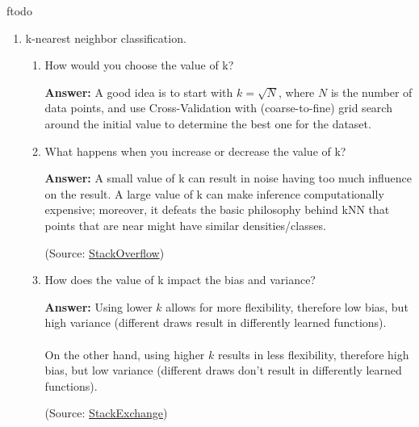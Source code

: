 ƒtodo\documentclass{article}
\newenvironment{QandA}{\begin{enumerate}[label=\arabic*.]}{\end{enumerate}}
\newenvironment{InnerQandA}{\begin{enumerate}[label=\roman*.]}{\end{enumerate}}
\newenvironment{answer}{\par\normalfont \textbf{Answer:}}{}
\begin{document}
\begin{QandA}
    \item k-nearest neighbor classification.
    \begin{InnerQandA}
        \item How would you choose the value of k?
        \begin{answer}
            A good idea is to start with $k = \sqrt{N}$, where $N$ is the number of data points, and use Cross-Validation with (coarse-to-fine) grid search around the initial value to determine the best one for the dataset.
        \end{answer}

        \item What happens when you increase or decrease the value of k?
        \begin{answer}
            A small value of k can result in noise having too much influence on the result. A large value of k can make inference computationally expensive; moreover, it defeats the basic philosophy behind kNN that points that are near might have similar densities/classes.  

            (Source: \href{https://stackoverflow.com/questions/11568897/value-of-k-in-k-nearest-neighbor-algorithm}{StackOverflow})
        \end{answer}

        \item How does the value of k impact the bias and variance?
        \begin{answer}
            Using lower $k$ allows for more flexibility, therefore low bias, but high variance (different draws result in differently learned functions).\\\\
            On the other hand, using higher $k$ results in less flexibility, therefore high bias, but low variance (different draws don't result in differently learned functions).
        
            (Source: \href{https://stats.stackexchange.com/questions/485884/bias-and-variance-in-knn-and-decision-trees}{StackExchange})
        \end{answer}
    \end{InnerQandA}


\end{QandA}
\end{document}
